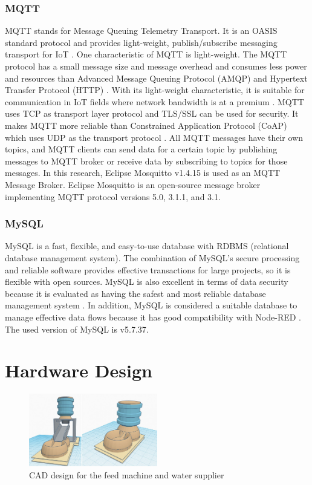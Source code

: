 \documentclass[conference]{IEEEtran}
\begin{document}
\subsubsection{MQTT}
MQTT stands for Message Queuing Telemetry Transport. It is an OASIS standard protocol and provides light-weight, publish/subscribe messaging transport for IoT \cite{b9}.
One characteristic of MQTT is light-weight. The MQTT protocol has a small message size and message overhead and consumes less power and resources than Advanced Message Queuing Protocol (AMQP) and Hypertext Transfer Protocol (HTTP) \cite{b18}. With its light-weight characteristic, it is suitable for communication in IoT fields where network bandwidth is at a premium \cite{b19}.
MQTT uses TCP as transport layer protocol and TLS/SSL can be used for security. It makes MQTT more reliable than Constrained Application Protocol (CoAP) which uses UDP as the transport protocol \cite{b18}.
All MQTT messages have their own topics, and MQTT clients can send data for a certain topic by publishing messages to MQTT broker or receive data by subscribing to topics for those messages.
In this research, Eclipse Mosquitto v1.4.15 is used as an MQTT Message Broker. Eclipse Mosquitto is an open-source message broker implementing MQTT protocol versions 5.0, 3.1.1, and 3.1\cite{b20}. 

\subsubsection{MySQL}
MySQL is a fast, flexible, and easy-to-use database with RDBMS (relational database management system). The combination of MySQL’s secure processing and reliable software provides effective transactions for large projects, so it is flexible with open sources. MySQL is also excellent in terms of data security because it is evaluated as having the safest and most reliable database management system \cite{b21}. In addition, MySQL is considered a suitable database to manage effective data flows because it has good compatibility with Node-RED \cite{b21}. The used version of MySQL is v5.7.37.

\section{Hardware Design}
\begin{figure}[htbp]
\centerline{\includegraphics[width=0.5\textwidth]{./images/Feed Machine & Water Supplier.jpg}}
\caption{CAD design for the feed machine and water supplier}
\label{fig}
\end{figure}
\end{document}
